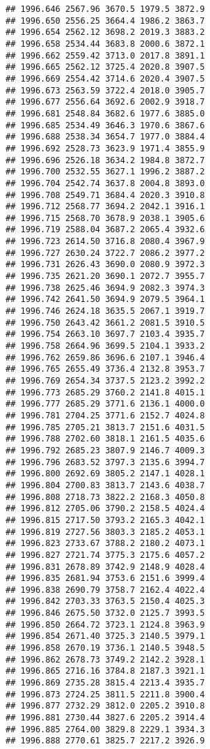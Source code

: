 \documentclass[
]{article}
\begin{document}
\begin{verbatim}
## 1996.646 2567.96 3670.5 1979.5 3872.9
## 1996.650 2556.25 3664.4 1986.2 3863.7
## 1996.654 2562.12 3698.2 2019.3 3883.2
## 1996.658 2534.44 3683.8 2000.6 3872.1
## 1996.662 2559.42 3713.0 2017.8 3891.1
## 1996.665 2562.12 3725.4 2020.8 3907.5
## 1996.669 2554.42 3714.6 2020.4 3907.5
## 1996.673 2563.59 3722.4 2018.0 3905.7
## 1996.677 2556.64 3692.6 2002.9 3918.7
## 1996.681 2548.84 3682.6 1977.6 3885.0
## 1996.685 2534.49 3646.3 1970.6 3867.6
## 1996.688 2538.34 3654.7 1977.0 3884.4
## 1996.692 2528.73 3623.9 1971.4 3855.9
## 1996.696 2526.18 3634.2 1984.8 3872.7
## 1996.700 2532.55 3627.1 1996.2 3887.2
## 1996.704 2542.74 3637.8 2004.8 3893.0
## 1996.708 2549.71 3684.4 2020.3 3910.8
## 1996.712 2568.77 3694.2 2042.1 3916.1
## 1996.715 2568.70 3678.9 2038.1 3905.6
## 1996.719 2588.04 3687.2 2065.4 3932.6
## 1996.723 2614.50 3716.8 2080.4 3967.9
## 1996.727 2630.24 3722.7 2086.2 3977.2
## 1996.731 2626.43 3690.0 2080.9 3972.3
## 1996.735 2621.20 3690.1 2072.7 3955.7
## 1996.738 2625.46 3694.9 2082.3 3974.3
## 1996.742 2641.50 3694.9 2079.5 3964.1
## 1996.746 2624.18 3635.5 2067.1 3919.7
## 1996.750 2643.42 3661.2 2081.5 3910.5
## 1996.754 2663.10 3697.7 2103.4 3935.7
## 1996.758 2664.96 3699.5 2104.1 3933.2
## 1996.762 2659.86 3696.6 2107.1 3946.4
## 1996.765 2655.49 3736.4 2132.8 3953.7
## 1996.769 2654.34 3737.5 2123.2 3992.2
## 1996.773 2685.29 3760.2 2141.8 4015.1
## 1996.777 2685.29 3771.6 2136.1 4000.0
## 1996.781 2704.25 3771.6 2152.7 4024.8
## 1996.785 2705.21 3813.7 2151.6 4031.5
## 1996.788 2702.60 3818.1 2161.5 4035.6
## 1996.792 2685.23 3807.9 2146.7 4009.3
## 1996.796 2683.52 3797.3 2135.6 3994.7
## 1996.800 2692.69 3805.2 2147.1 4028.1
## 1996.804 2700.83 3813.7 2143.6 4038.7
## 1996.808 2718.73 3822.2 2168.3 4050.8
## 1996.812 2705.06 3790.2 2158.5 4024.4
## 1996.815 2717.50 3793.2 2165.3 4042.1
## 1996.819 2727.56 3803.3 2185.2 4053.1
## 1996.823 2733.67 3788.2 2180.2 4073.1
## 1996.827 2721.74 3775.3 2175.6 4057.2
## 1996.831 2678.89 3742.9 2148.9 4028.4
## 1996.835 2681.94 3753.6 2151.6 3999.4
## 1996.838 2690.79 3758.7 2162.4 4022.4
## 1996.842 2703.33 3763.5 2150.4 4025.3
## 1996.846 2675.50 3732.0 2125.7 3993.5
## 1996.850 2664.72 3723.1 2124.8 3963.9
## 1996.854 2671.40 3725.3 2140.5 3979.1
## 1996.858 2670.19 3736.1 2140.5 3948.5
## 1996.862 2678.73 3749.2 2142.2 3928.1
## 1996.865 2716.16 3784.8 2187.3 3921.1
## 1996.869 2735.28 3815.4 2213.4 3935.7
## 1996.873 2724.25 3811.5 2211.8 3900.4
## 1996.877 2732.29 3812.0 2205.2 3910.8
## 1996.881 2730.44 3827.6 2205.2 3914.4
## 1996.885 2764.00 3829.8 2229.1 3934.3
## 1996.888 2770.61 3825.7 2217.2 3926.9

\end{verbatim}
\end{document}
